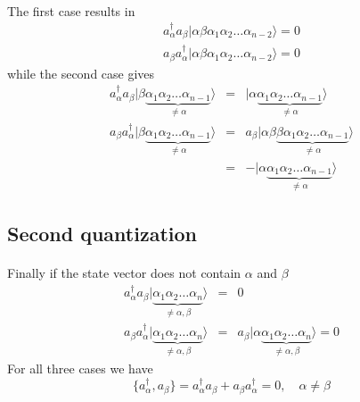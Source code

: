 \documentclass[%
twoside,                 %
final,                   %
10pt]{article}
\begin{document}
\paragraph{}
The first case results in
\begin{eqnarray}
	a_\alpha^{\dagger} a_\beta |\alpha\beta\alpha_1\alpha_2 \dots \alpha_{n-2}\rangle = 0 \nonumber \\
	a_\beta a_\alpha^{\dagger} |\alpha\beta\alpha_1\alpha_2 \dots \alpha_{n-2}\rangle = 0 \label{eq:2-18a}
\end{eqnarray}
while the second case gives
\begin{eqnarray}
	 a_\alpha^{\dagger} a_\beta |\beta \underbrace{\alpha_1\alpha_2 \dots \alpha_{n-1}}_{\neq \alpha}\rangle &=& 
	 	|\alpha \underbrace{\alpha_1\alpha_2 \dots \alpha_{n-1}}_{\neq  \alpha}\rangle \nonumber \\
	a_\beta a_\alpha^{\dagger} |\beta \underbrace{\alpha_1\alpha_2 \dots \alpha_{n-1}}_{\neq \alpha}\rangle &=&
		a_\beta |\alpha\beta\underbrace{\beta \alpha_1\alpha_2 \dots \alpha_{n-1}}_{\neq \alpha}\rangle \nonumber \\
	&=& - |\alpha\underbrace{\alpha_1\alpha_2 \dots \alpha_{n-1}}_{\neq \alpha}\rangle \label{eq:2-18b}
\end{eqnarray}




\subsection*{Second quantization}

\paragraph{}
Finally if the state vector does not contain $\alpha$ and $\beta$
\begin{eqnarray}
	a_\alpha^{\dagger} a_\beta |\underbrace{\alpha_1\alpha_2 \dots \alpha_{n}}_{\neq \alpha,\beta}\rangle &=& 0 \nonumber \\
	a_\beta a_\alpha^{\dagger} |\underbrace{\alpha_1\alpha_2 \dots \alpha_{n}}_{\neq \alpha,\beta}\rangle &=& 
		a_\beta |\alpha \underbrace{\alpha_1\alpha_2 \dots \alpha_{n}}_{\neq \alpha,\beta}\rangle = 0 \label{eq:2-18c}
\end{eqnarray}
For all three cases we have
\begin{equation}
	\{a_\alpha^{\dagger},a_\beta \} = a_\alpha^{\dagger} a_\beta + a_\beta a_\alpha^{\dagger} = 0, \quad \alpha \neq \beta \label{eq:2-19}
\end{equation}
\end{document}

